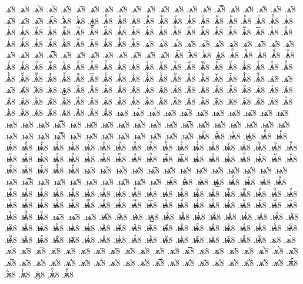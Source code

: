 {.ѧ҄8
.ѧ҅8
.ѧ҅̀8
.ѧ҅́8
.ѧ҅̂8
.ѧ҅̅8
.ѧ҅̆8
.ѧ҅̇8
.ѧ҅̈8
.ѧ҅̋8
.ѧ҅̏8
.ѧ҅̑8
.ѧ҅̓8
.ѧ҅̔8
.ѧ҅̾8
.ѧ҅̿8
.ѧ҅͘8
.ѧ҅҃8
.ѧ҅҄8
.ѧ҅҅8
.ѧ҅҆8
.ѧ҅҇8
.ѧ҅᷀8
.ѧ҅᷁8
.ѧ҅᷶8
.ѧ᷷҅8
.ѧ᷸҅8
.ѧ᷹҅8
.ѧ҅ⷠ8
.ѧ҅ⷡ8
.ѧ҅ⷢ8
.ѧ҅ⷣ8
.ѧ҅ⷤ8
.ѧ҅ⷥ8
.ѧ҅ⷦ8
.ѧ҅ⷧ8
.ѧ҅ⷨ8
.ѧ҅ⷩ8
.ѧ҅ⷪ8
.ѧ҅ⷫ8
.ѧ҅ⷬ8
.ѧ҅ⷭ8
.ѧ҅ⷮ8
.ѧ҅ⷯ8
.ѧ҅ⷰ8
.ѧ҅ⷱ8
.ѧ҅ⷲ8
.ѧ҅ⷳ8
.ѧ҅ⷴ8
.ѧ҅ⷵ8
.ѧ҅ⷶ8
.ѧ҅ⷷ8
.ѧ҅ⷸ8
.ѧ҅ⷹ8
.ѧ҅ⷺ8
.ѧ҅ⷻ8
.ѧ҅ⷼ8
.ѧ҅ⷽ8
.ѧ҅ⷾ8
.ѧ҅ⷿ8
.ѧ҅꙯8
.ѧ҅ꙴ8
.ѧ҅ꙵ8
.ѧ҅ꙶ8
.ѧ҅ꙷ8
.ѧ҅ꙸ8
.ѧ҅ꙹ8
.ѧ҅ꙺ8
.ѧ҅ꙻ8
.ѧ҅꙼8
.ѧ҅꙽8
.ѧ҅ꚞ8
.ѧ҅ꚟ8
.ѧ҆8
.ѧ҆̀8
.ѧ҆́8
.ѧ҆̂8
.ѧ҆̅8
.ѧ҆̆8
.ѧ҆̇8
.ѧ҆̈8
.ѧ҆̋8
.ѧ҆̏8
.ѧ҆̑8
.ѧ҆̓8
.ѧ҆̔8
.ѧ҆̾8
.ѧ҆̿8
.ѧ҆͘8
.ѧ҆҃8
.ѧ҆҄8
.ѧ҆҅8
.ѧ҆҆8
.ѧ҆҇8
.ѧ҆᷀8
.ѧ҆᷁8
.ѧ҆᷶8
.ѧ᷷҆8
.ѧ᷸҆8
.ѧ᷹҆8
.ѧ҆ⷠ8
.ѧ҆ⷡ8
.ѧ҆ⷢ8
.ѧ҆ⷣ8
.ѧ҆ⷤ8
.ѧ҆ⷥ8
.ѧ҆ⷦ8
.ѧ҆ⷧ8
.ѧ҆ⷨ8
.ѧ҆ⷩ8
.ѧ҆ⷪ8
.ѧ҆ⷫ8
.ѧ҆ⷬ8
.ѧ҆ⷭ8
.ѧ҆ⷮ8
.ѧ҆ⷯ8
.ѧ҆ⷰ8
.ѧ҆ⷱ8
.ѧ҆ⷲ8
.ѧ҆ⷳ8
.ѧ҆ⷴ8
.ѧ҆ⷵ8
.ѧ҆ⷶ8
.ѧ҆ⷷ8
.ѧ҆ⷸ8
.ѧ҆ⷹ8
.ѧ҆ⷺ8
.ѧ҆ⷻ8
.ѧ҆ⷼ8
.ѧ҆ⷽ8
.ѧ҆ⷾ8
.ѧ҆ⷿ8
.ѧ҆꙯8
.ѧ҆ꙴ8
.ѧ҆ꙵ8
.ѧ҆ꙶ8
.ѧ҆ꙷ8
.ѧ҆ꙸ8
.ѧ҆ꙹ8
.ѧ҆ꙺ8
.ѧ҆ꙻ8
.ѧ҆꙼8
.ѧ҆꙽8
.ѧ҆ꚞ8
.ѧ҆ꚟ8
.ѧ҇8
.ѧ᷀8
.ѧ᷁8
.ѧ᷶8
.ѧ᷷8
.ѧ᷸8
.ѧ᷹8
.ѧⷠ8
.ѧⷡ8
.ѧⷢ8
.ѧⷣ8
.ѧⷤ8
.ѧⷥ8
.ѧⷦ8
.ѧⷧ8
.ѧⷨ8
.ѧⷩ8
.ѧⷪ8
.ѧⷫ8
.ѧⷬ8
.ѧⷭ8
.ѧⷮ8
.ѧⷯ8
.ѧⷰ8
.ѧⷱ8
.ѧⷲ8
.ѧⷳ8
.ѧⷴ8
.ѧⷵ8
.ѧⷶ8
.ѧⷷ8
.ѧⷸ8
.ѧⷹ8
.ѧⷺ8
.ѧⷻ8
.ѧⷼ8
.ѧⷽ8
.ѧⷾ8
.ѧⷿ8
.ѧ꙯8
.ѧꙴ8
.ѧꙵ8
.ѧꙶ8
.ѧꙷ8
.ѧꙸ8
.ѧꙹ8
.ѧꙺ8
.ѧꙻ8
.ѧ꙼8
.ѧ꙽8
.ѧꚞ8
.ѧꚟ8
.ѩ8
.ѩ̀8
.ѩ́8
.ѩ̂8
.ѩ̅8
.ѩ̆8
.ѩ̇8
.ѩ̈8
.ѩ̋8
.ѩ̏8
.ѩ̑8
.ѩ̓8
.ѩ̔8
.ѩ̾8
.ѩ̿8
.ѩ͘8
.ѩ҃8
.ѩ҄8
.ѩ҅8
.ѩ҅̀8
.ѩ҅́8
.ѩ҅̂8
.ѩ҅̅8
.ѩ҅̆8
.ѩ҅̇8
.ѩ҅̈8
.ѩ҅̋8
.ѩ҅̏8
.ѩ҅̑8
.ѩ҅̓8
.ѩ҅̔8
.ѩ҅̾8
.ѩ҅̿8
.ѩ҅͘8
.ѩ҅҃8
.ѩ҅҄8
.ѩ҅҅8
.ѩ҅҆8
.ѩ҅҇8
.ѩ҅᷀8
.ѩ҅᷁8
.ѩ҅᷶8
.ѩ᷷҅8
.ѩ᷸҅8
.ѩ᷹҅8
.ѩ҅ⷠ8
.ѩ҅ⷡ8
.ѩ҅ⷢ8
.ѩ҅ⷣ8
.ѩ҅ⷤ8
.ѩ҅ⷥ8
.ѩ҅ⷦ8
.ѩ҅ⷧ8
.ѩ҅ⷨ8
.ѩ҅ⷩ8
.ѩ҅ⷪ8
.ѩ҅ⷫ8
.ѩ҅ⷬ8
.ѩ҅ⷭ8
.ѩ҅ⷮ8
.ѩ҅ⷯ8
.ѩ҅ⷰ8
.ѩ҅ⷱ8
.ѩ҅ⷲ8
.ѩ҅ⷳ8
.ѩ҅ⷴ8
.ѩ҅ⷵ8
.ѩ҅ⷶ8
.ѩ҅ⷷ8
.ѩ҅ⷸ8
.ѩ҅ⷹ8
.ѩ҅ⷺ8
.ѩ҅ⷻ8
.ѩ҅ⷼ8
.ѩ҅ⷽ8
.ѩ҅ⷾ8
.ѩ҅ⷿ8
.ѩ҅꙯8
.ѩ҅ꙴ8
.ѩ҅ꙵ8
.ѩ҅ꙶ8
.ѩ҅ꙷ8
.ѩ҅ꙸ8
.ѩ҅ꙹ8
.ѩ҅ꙺ8
.ѩ҅ꙻ8
.ѩ҅꙼8
.ѩ҅꙽8
.ѩ҅ꚞ8
.ѩ҅ꚟ8
.ѩ҆8
.ѩ҆̀8
.ѩ҆́8
.ѩ҆̂8
.ѩ҆̅8
.ѩ҆̆8
.ѩ҆̇8
.ѩ҆̈8
.ѩ҆̋8
.ѩ҆̏8
.ѩ҆̑8
.ѩ҆̓8
.ѩ҆̔8
.ѩ҆̾8
.ѩ҆̿8
.ѩ҆͘8
.ѩ҆҃8
.ѩ҆҄8
.ѩ҆҅8
.ѩ҆҆8
.ѩ҆҇8
.ѩ҆᷀8
.ѩ҆᷁8
.ѩ҆᷶8
.ѩ᷷҆8
.ѩ᷸҆8
.ѩ᷹҆8
.ѩ҆ⷠ8
.ѩ҆ⷡ8
.ѩ҆ⷢ8
.ѩ҆ⷣ8
.ѩ҆ⷤ8
.ѩ҆ⷥ8
.ѩ҆ⷦ8
.ѩ҆ⷧ8
.ѩ҆ⷨ8
.ѩ҆ⷩ8
.ѩ҆ⷪ8
.ѩ҆ⷫ8
.ѩ҆ⷬ8
.ѩ҆ⷭ8
.ѩ҆ⷮ8
.ѩ҆ⷯ8
.ѩ҆ⷰ8
.ѩ҆ⷱ8
.ѩ҆ⷲ8
.ѩ҆ⷳ8
.ѩ҆ⷴ8
.ѩ҆ⷵ8
.ѩ҆ⷶ8
.ѩ҆ⷷ8
.ѩ҆ⷸ8
.ѩ҆ⷹ8
.ѩ҆ⷺ8
.ѩ҆ⷻ8
.ѩ҆ⷼ8
.ѩ҆ⷽ8
.ѩ҆ⷾ8
.ѩ҆ⷿ8
.ѩ҆꙯8
.ѩ҆ꙴ8
.ѩ҆ꙵ8
.ѩ҆ꙶ8
.ѩ҆ꙷ8
.ѩ҆ꙸ8
.ѩ҆ꙹ8
.ѩ҆ꙺ8
.ѩ҆ꙻ8
.ѩ҆꙼8
.ѩ҆꙽8
.ѩ҆ꚞ8
.ѩ҆ꚟ8
.ѩ҇8
.ѩ᷀8
.ѩ᷁8
.ѩ᷶8
.ѩ᷷8
.ѩ᷸8
.ѩ᷹8
.ѩⷠ8
.ѩⷡ8
.ѩⷢ8
.ѩⷣ8
.ѩⷤ8
.ѩⷥ8
.ѩⷦ8
.ѩⷧ8
.ѩⷨ8
.ѩⷩ8
.ѩⷪ8
.ѩⷫ8
.ѩⷬ8
.ѩⷭ8
.ѩⷮ8
.ѩⷯ8
.ѩⷰ8
.ѩⷱ8
.ѩⷲ8
.ѩⷳ8
.ѩⷴ8
.ѩⷵ8
.ѩⷶ8
.ѩⷷ8
.ѩⷸ8
.ѩⷹ8
.ѩⷺ8
.ѩⷻ8
.ѩⷼ8
.ѩⷽ8
.ѩⷾ8
.ѩⷿ8
.ѩ꙯8
.ѩꙴ8
.ѩꙵ8
.ѩꙶ8
.ѩꙷ8
.ѩꙸ8
.ѩꙹ8
.ѩꙺ8
.ѩꙻ8
.ѩ꙼8
.ѩ꙽8
.ѩꚞ8
.ѩꚟ8
.ѫ8
.ѫ̀8
.ѫ́8
.ѫ̂8
.ѫ̅8
.ѫ̆8
.ѫ̇8
.ѫ̈8
.ѫ̋8
.ѫ̏8
.ѫ̑8
.ѫ̓8
.ѫ̔8
.ѫ̾8
.ѫ̿8
.ѫ͘8
.ѫ҃8
.ѫ҄8
.ѫ҅8
.ѫ҅̀8
.ѫ҅́8
.ѫ҅̂8
.ѫ҅̅8
.ѫ҅̆8
.ѫ҅̇8
.ѫ҅̈8
.ѫ҅̋8
.ѫ҅̏8
.ѫ҅̑8
.ѫ҅̓8
.ѫ҅̔8
.ѫ҅̾8
.ѫ҅̿8
.ѫ҅͘8
.ѫ҅҃8
.ѫ҅҄8
.ѫ҅҅8
.ѫ҅҆8
.ѫ҅҇8
.ѫ҅᷀8
.ѫ҅᷁8
.ѫ҅᷶8
.ѫ᷷҅8
.ѫ᷸҅8
.ѫ᷹҅8
.ѫ҅ⷠ8
.ѫ҅ⷡ8
}
